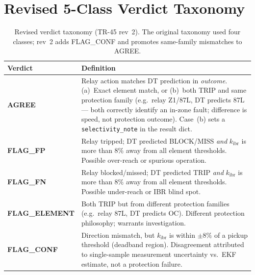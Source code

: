 \documentclass[11pt,a4paper]{article}
\newcommand{\kibr}{k_\mathrm{ibr}}
\begin{document}
\section{Revised 5-Class Verdict Taxonomy}
\label{sec:taxonomy}

\begin{table}[htbp]
  \centering
  \caption{Revised verdict taxonomy (TR-45 rev~2).  The original taxonomy used
    four classes; rev~2 adds FLAG\_CONF and promotes same-family mismatches to
    AGREE.}
  \label{tab:taxonomy}
  \begin{tabular}{@{}p{2.6cm}p{10.4cm}@{}}
    \toprule
    Verdict & Definition \\
    \midrule
    \textbf{AGREE}       & Relay action matches DT prediction in \emph{outcome}.
                           (a)~Exact element match, or
                           (b)~both TRIP and same protection family (e.g.\ relay Z1/87L,
                           DT predicts 87L — both correctly identify an in-zone fault;
                           difference is speed, not protection outcome).
                           Case~(b) sets a \texttt{selectivity\_note} in the result dict. \\
    \addlinespace
    \textbf{FLAG\_FP}    & Relay tripped; DT predicted BLOCK/MISS \emph{and} $\kibr$
                           is more than 8\% away from all element thresholds.
                           Possible over-reach or spurious operation. \\
    \addlinespace
    \textbf{FLAG\_FN}    & Relay blocked/missed; DT predicted TRIP \emph{and} $\kibr$
                           is more than 8\% away from all element thresholds.
                           Possible under-reach or IBR blind spot. \\
    \addlinespace
    \textbf{FLAG\_ELEMENT} & Both TRIP but from different protection families
                           (e.g.\ relay 87L, DT predicts OC).
                           Different protection philosophy; warrants investigation. \\
    \addlinespace
    \textbf{FLAG\_CONF}  & Direction mismatch, but $\kibr$ is within $\pm8\%$ of a
                           pickup threshold (deadband region).
                           Disagreement attributed to single-sample measurement
                           uncertainty vs.\ EKF estimate, not a protection failure. \\
    \bottomrule
  \end{tabular}
\end{table}
\end{document}
